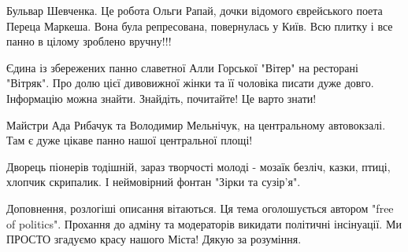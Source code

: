 Бульвар Шевченка. Це робота Ольги Рапай, дочки відомого єврейського поета
Переца Маркеша. Вона була репресована, повернулась у Київ. Всю плитку і все
панно в цілому зроблено вручну!!!

Єдина із збережених панно славетної Алли Горської "Вітер" на ресторані
"Вітряк". Про долю цієї дивовижної жінки та її чоловіка писати дуже довго.
Інформацію можна знайти. Знайдіть, почитайте! Це варто знати!

Майстри Ада Рибачук та Володимир Мельнічук, на центральному автовокзалі. Там є
дуже цікаве панно нашої центральної площі!

Дворець піонерів тодішній, зараз творчості молоді - мозаїк безліч, казки,
птиці, хлопчик скрипалик. І неймовірний фонтан "Зірки та сузір'я".

Доповнення, розлогіші описання вітаються. Ця тема оголошується автором "free of
politics". Прохання до адміну та модераторів викидати політичні інсінуації. Ми
ПРОСТО згадуємо красу нашого Міста! Дякую за розуміння.

